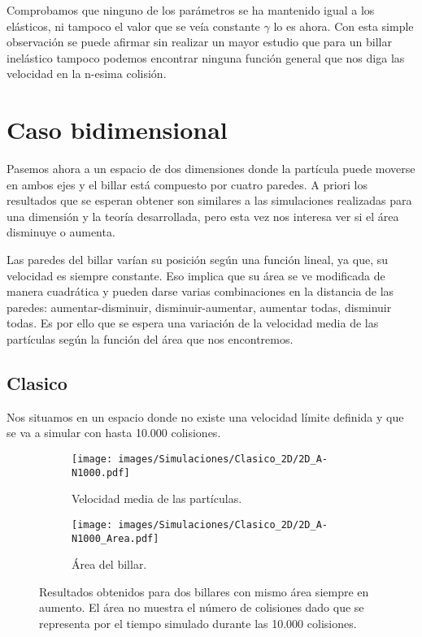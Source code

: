 \vspace{3mm}

Comprobamos que ninguno de los parámetros se ha mantenido igual a los elásticos, ni tampoco el valor que se veía constante \( \gamma \) lo es ahora. Con esta simple observación se puede afirmar sin realizar un mayor estudio que para un billar inelástico tampoco podemos encontrar ninguna función general que nos diga las velocidad en la n-esima colisión. 


\section{Caso bidimensional}

Pasemos ahora a un espacio de dos dimensiones donde la partícula puede moverse en ambos ejes y el billar está compuesto por cuatro paredes. A priori los resultados que se esperan obtener son similares a las simulaciones realizadas para una dimensión y la teoría desarrollada, pero esta vez nos interesa ver si el área disminuye o aumenta.

\vspace{3mm}

Las paredes del billar varían su posición según una función lineal, ya que, su velocidad es siempre constante. Eso implica que su área se ve modificada de manera cuadrática y pueden darse varias combinaciones en la distancia de las paredes: aumentar-disminuir, disminuir-aumentar, aumentar todas, disminuir todas. Es por ello que se espera una variación de la velocidad media de las partículas según la función del área que nos encontremos. 

\subsection{Clasico}

Nos situamos en un espacio donde no existe una velocidad límite definida y que se va a simular con hasta 10.000 colisiones.

\begin{figure}[!h]
    \begin{subfigure}[b]{0.5\textwidth}
        \centering
        \texttt{[image: images/Simulaciones/Clasico\_2D/2D\_A-N1000.pdf]}
        \caption{Velocidad media de las partículas.}
    \end{subfigure}
    \hfill
    \begin{subfigure}[b]{0.5\textwidth}
        \centering
        \texttt{[image: images/Simulaciones/Clasico\_2D/2D\_A-N1000\_Area.pdf]}
        \caption{Área del billar.}
    \end{subfigure}
    \caption{Resultados obtenidos para dos billares con mismo área siempre en aumento. El área no muestra el número de colisiones dado que se representa por el tiempo simulado durante las 10.000 colisiones.}
    \label{fig:2D_A-N1000_con_Area}
\end{figure}

